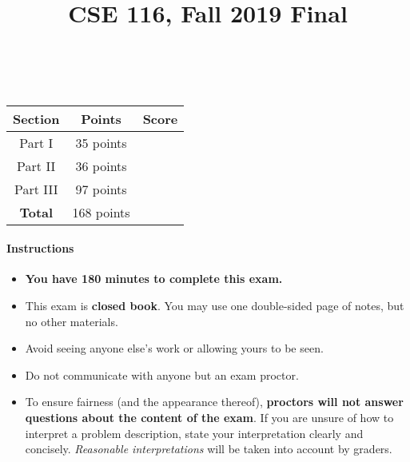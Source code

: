\documentclass[paper=letter, fontsize=13pt]{article} %
\title{\vspace{-2em} 	
\normalfont \normalsize 
{\huge CSE 116, Fall 2019 Final} \\ %
\horrule{2pt} \\[0.5cm] %
}
\date{\vspace{-4em}} %
\numberwithin{equation}{section} %
\begin{document}
\maketitle %


\begin{center}
 {\Large
\begin{tabular}{|c|c|c|}
\hline
\textbf{Section} & \textbf{Points} & \textbf{Score} \\
\hline
Part I     & 35 points  & \\
\hline
Part II   &  36 points &   \\
\hline
Part III   &  97 points &   \\
\hline
 \textbf{Total} & 168 points &   \\
\hline
\end{tabular}
}

\end{center}
\large 


\paragraph{\textbf{ Instructions} }
\begin{itemize}

\item \textbf{You have 180 minutes to complete this exam.}

\item This exam is \textbf{closed book}.  You may use one double-sided
page of notes, but no other materials.

\item Avoid seeing anyone else's work or allowing yours to be seen.

\item Do not communicate with anyone but an exam proctor.

\item To ensure fairness (and the appearance thereof),
  \textbf{proctors will not answer questions about the content of the exam}. If you are unsure 
  of how to interpret a problem description, state your interpretation clearly and concisely. 
  \textit{Reasonable interpretations} will be taken into account by graders.

\end{itemize}
\end{document}
